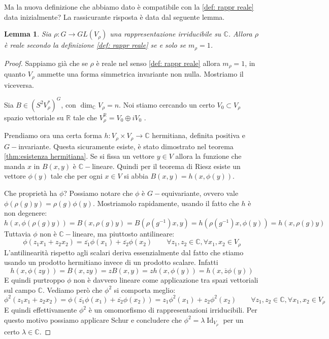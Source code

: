 \documentclass[11pt]{article}
\theoremstyle{plain}
\newtheorem{lemma}[thm]{Lemma}
\theoremstyle{definition}
\theoremstyle{remark}
\newcommand{\C}{\mathbb{C}}
\newcommand{\R}{\mathbb{R}}
\DeclareMathOperator{\Id}{Id}
\begin{document}
Ma la nuova definizione che abbiamo dato è compatibile con la \ref{def: rappr reale} data inizialmente?
La rassicurante risposta è data dal seguente lemma.
\begin{lemma}
Sia $\rho:G\to GL(V_\rho)$ una rappresentazione irriducibile su $\C$. Allora $\rho$ è reale secondo la definizione \ref{def: rappr reale} se e solo se $m_\rho = 1$.
\end{lemma}
\begin{proof}
Sappiamo già che se $\rho$ è reale nel senso \ref{def: rappr reale} allora $m_\rho = 1$, in quanto $V_\rho$ ammette una forma simmetrica invariante non nulla. Mostriamo il viceversa.

Sia $B \in (S^2V_\rho^*)^G$, con $\dim_\C V_\rho = n$.
Noi stiamo cercando un certo $V_0 \subset V_\rho$ spazio vettoriale su $\R$ tale che $V_\rho^\R = V_0 \oplus i V_0$ .

Prendiamo ora una certa forma $h : V_\rho \times V_\rho \to \C$ hermitiana, definita positiva e $G-$invariante. Questa sicuramente esiste, è stato dimostrato nel teorema \ref{thm:esistenza hermitiana}.
Se si fissa un vettore $y\in V$ allora la funzione che manda $x$ in $B(x,y)$ è $\C-$lineare. Quindi per il teorema di Riesz esiste un vettore $\phi(y)$
tale che per ogni $x\in V$ si abbia $B(x, y) = h(x, \phi(y))$.

Che proprietà ha $\phi$? Possiamo notare che $\phi$ è $G-$equivariante, ovvero vale $\phi(\rho(g)y) = \rho(g) \phi(y)$.
Mostriamolo rapidamente, usando il fatto che $h$ è non degenere:
\[ h(x, \phi(\rho(g)y)) = B(x, \rho(g)y) = B(\rho(g^{-1} ) x, y) = h (\rho(g^{-1} ) x, \phi(y)) = h(x, \rho(g)y)\]
Tuttavia $\phi$ non è $\C-$lineare, ma piuttosto antilineare:
\[ \phi(z_1 x_1 + z_2 x_2) = \overline{z_1} \phi(x_1) + \overline{z_2} \phi(x_2) \qquad \forall z_1, z_2 \in \C, \forall x_1, x_2 \in V_\rho\]
L'antilinearità rispetto agli scalari deriva essenzialmente dal fatto che stiamo usando un prodotto hermitiano invece di un prodotto scalare. Infatti
\[ h( x, \phi(zy) ) = B(x, zy) = z B(x,y) = z h(x, \phi(y)) = h(x, \overline{z} \phi(y)) \]
E quindi purtroppo $\phi$ non è davvero lineare come applicazione tra spazi vettoriali sul campo $\C$. Vediamo però che $\phi^2$ si comporta meglio:
\[\phi^2(z_1 x_1 + z_2 x_2) = \phi(\overline{z_1} \phi(x_1) + \overline{z_2} \phi(x_2))  = z_1 \phi^2(x_1) + z_2 \phi^2(x_2) \qquad \forall z_1, z_2 \in \C, \forall x_1, x_2 \in V_\rho \]
E quindi effettivamente $\phi^2$ è un omomorfismo di rappresentazioni irriducibili. Per questo motivo possiamo applicare Schur e concludere che
$\phi^ 2 = \lambda \Id_{V_\rho}$ per un certo $\lambda \in \C$.


\end{proof}
\end{document}
